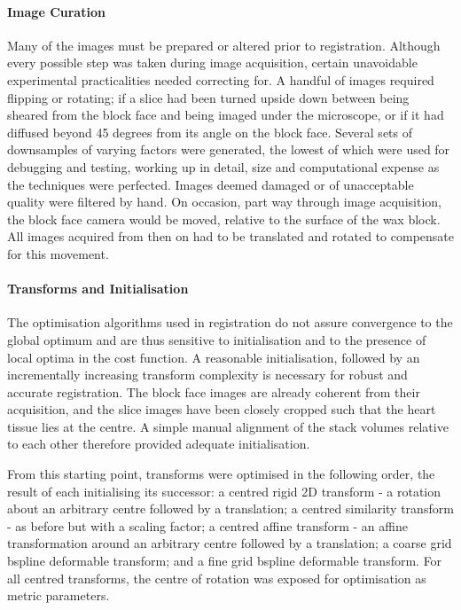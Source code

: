       \paragraph{Image Curation}
        Many of the images must be prepared or altered prior to registration. Although every possible step was taken during image acquisition, certain unavoidable experimental practicalities needed correcting for. A handful of images required flipping or rotating; if a slice had been turned upside down between being sheared from the block face and being imaged under the microscope, or if it had diffused beyond 45 degrees from its angle on the block face. Several sets of downsamples of varying factors were generated, the lowest of which were used for debugging and testing, working up in detail, size and computational expense as the techniques were perfected. Images deemed damaged or of unacceptable quality were filtered by hand. On occasion, part way through image acquisition, the block face camera would be moved, relative to the surface of the wax block. All images acquired from then on had to be translated and rotated to compensate for this movement.

      \paragraph{Transforms and Initialisation}
        The optimisation algorithms used in registration do not assure convergence to the global optimum and are thus sensitive to initialisation and to the presence of local optima in the cost function. A reasonable initialisation, followed by an incrementally increasing transform complexity is necessary for robust and accurate registration. The block face images are already coherent from their acquisition, and the slice images have been closely cropped such that the heart tissue lies at the centre. A simple manual alignment of the stack volumes relative to each other therefore provided adequate initialisation.

        From this starting point, transforms were optimised in the following order, the result of each initialising its successor: a centred rigid 2D transform - a rotation about an arbitrary centre followed by a translation; a centred similarity transform - as before but with a scaling factor; a centred affine transform - an affine transformation around an arbitrary centre followed by a translation; a coarse grid bspline deformable transform; and a fine grid bspline deformable transform. For all centred transforms, the centre of rotation was exposed for optimisation as metric parameters.

